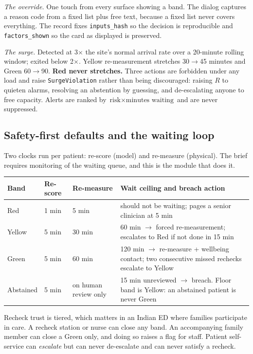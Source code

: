 \documentclass[10pt,a4paper,twocolumn]{article}
\newcommand{\cm}[1]{\texttt{#1}}
\begin{document}
\emph{The override.} One touch from every surface showing a band. The dialog captures a reason code
from a fixed list plus free text, because a fixed list never covers everything. The record fixes
\cm{inputs\_hash} so the decision is reproducible and \cm{factors\_shown} so the card as displayed
is preserved.

\emph{The surge.} Detected at 3$\times$ the site's normal arrival rate over a 20-minute rolling
window; exited below 2$\times$. Yellow re-measurement stretches 30$\rightarrow$45 minutes and Green
60$\rightarrow$90. \textbf{Red never stretches.} Three actions are forbidden under any load and
raise \cm{SurgeViolation} rather than being discouraged: raising $R$ to quieten alarms, resolving
an abstention by guessing, and de-escalating anyone to free capacity. Alerts are ranked by
$\text{risk}\times\text{minutes waiting}$ and are never suppressed.

\subsection{Safety-first defaults and the waiting loop}
Two clocks run per patient: re-score (model) and re-measure (physical). The brief requires
monitoring of the waiting queue, and this is the module that does it.

\begin{center}\footnotesize\sffamily
\begin{tabular}{@{}p{1.32cm}p{1.12cm}p{1.18cm}p{3.28cm}@{}}
\toprule
\rowcolor{AccPurple!10}
\textbf{Band} & \textbf{Re-score} & \textbf{Re-measure} & \textbf{Wait ceiling and breach action}\\
\midrule
Red & 1 min & 5 min & should not be waiting; pages a senior clinician at 5 min\\
\addlinespace[2pt]
Yellow & 5 min & 30 min & 60 min $\rightarrow$ forced re-measurement; escalates to Red if not done in 15 min\\
\addlinespace[2pt]
Green & 5 min & 60 min & 120 min $\rightarrow$ re-measure + wellbeing contact; two consecutive missed rechecks escalate to Yellow\\
\addlinespace[2pt]
Abstained & 5 min & on human review only & 15 min unreviewed $\rightarrow$ breach. Floor band is Yellow: an abstained patient is never Green\\
\bottomrule
\end{tabular}
\end{center}

\vspace{3pt}
Recheck trust is tiered, which matters in an Indian ED where families participate in care. A
recheck station or nurse can close any band. An accompanying family member can close a Green only,
and doing so raises a flag for staff. Patient self-service can \emph{escalate} but can never
de-escalate and can never satisfy a recheck.
\end{document}
